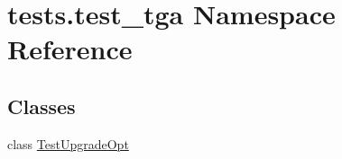 \hypertarget{namespacetests_1_1test__tga}{}\section{tests.\+test\+\_\+tga Namespace Reference}
\label{namespacetests_1_1test__tga}
\subsection*{Classes}
\begin{DoxyCompactItemize}
\item 
class \hyperlink{classtests_1_1test__tga_1_1TestUpgradeOpt}{Test\+Upgrade\+Opt}
\end{DoxyCompactItemize}
